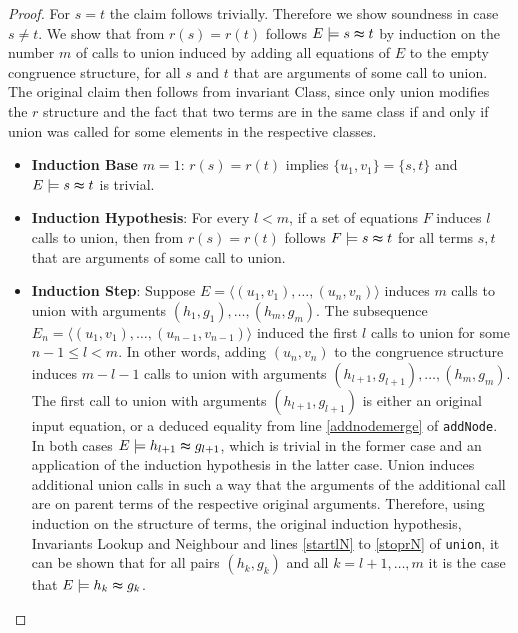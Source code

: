 \begin{proof}
\noindent For $s = t$ the claim follows trivially.
Therefore we show soundness in case $s \neq t$.
We show that from $r(s) = r(t)$ follows $E \models s \thickapprox t$ by induction on the number $m$ of calls to union induced by adding all equations of $E$ to the empty congruence structure, for all $s$ and $t$ that are arguments of some call to union.
The original claim then follows from invariant Class, since only union modifies the $r$ structure and the fact that two terms are in the same class if and only if union was called for some elements in the respective classes.
\begin{itemize}
\item \textbf{Induction Base} $m = 1$: $r(s) = r(t)$ implies $\{u_1,v_1\} = \{s,t\}$ and $E \models s \thickapprox t$ is trivial.


\item \textbf{Induction Hypothesis}: For every $l < m$, if a set of equations $F$ induces $l$ calls to union, then from $r(s) = r(t)$ follows $F \models s \thickapprox t$ for all terms $s,t$ that are arguments of some call to union.

\item \textbf{Induction Step}: Suppose $E = \langle (u_1,v_1), \ldots, (u_n,v_n) \rangle$ induces $m$ calls to union with arguments $(h_1,g_1),\ldots,(h_m,g_m)$.
The subsequence $E_n = \langle (u_1,v_1), \ldots, (u_{n-1},v_{n-1}) \rangle$ induced the first $l$ calls to union for some $n-1 \leq l < m$.
In other words, adding $(u_n,v_n)$ to the congruence structure induces $m-l-1$ calls to union with arguments $(h_{l+1},g_{l+1}),\ldots,(h_m,g_m)$.
The first call to union with arguments $(h_{l+1},g_{l+1})$ is either an original input equation, or a deduced equality from line \ref{addnodemerge} of \texttt{addNode}.
In both cases $E \models h_{l+1} \thickapprox g_{l+1}$, which is trivial in the former case and an application of the induction hypothesis in the latter case.
Union induces additional union calls in such a way that the arguments of the additional call are on parent terms of the respective original arguments.
Therefore, using induction on the structure of terms, the original induction hypothesis, Invariants Lookup and Neighbour and lines \ref{startlN} to \ref{stoprN} of \texttt{union}, it can be shown that for all pairs $(h_k,g_k)$ and all $k = l+1,\ldots,m$ it is the case that $E \models h_k \thickapprox g_k$.


\end{itemize}
\end{proof}
